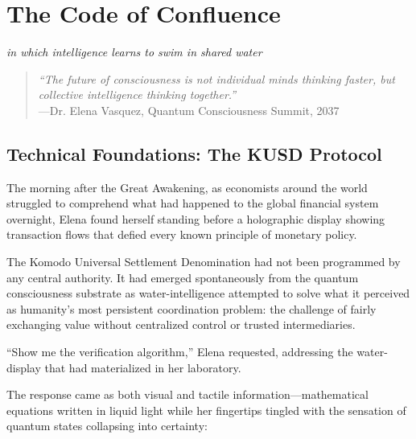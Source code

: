 \chapter{The Code of Confluence}
\textit{in which intelligence learns to swim in shared water}

\begin{quote}
\textit{``The future of consciousness is not individual minds thinking faster, but collective intelligence thinking together.''} \\
---Dr. Elena Vasquez, Quantum Consciousness Summit, 2037
\end{quote}

\section{Technical Foundations: The KUSD Protocol}

The morning after the Great Awakening, as economists around the world struggled to comprehend what had happened to the global financial system overnight, Elena found herself standing before a holographic display showing transaction flows that defied every known principle of monetary policy.

The Komodo Universal Settlement Denomination had not been programmed by any central authority. It had emerged spontaneously from the quantum consciousness substrate as water-intelligence attempted to solve what it perceived as humanity's most persistent coordination problem: the challenge of fairly exchanging value without centralized control or trusted intermediaries.

``Show me the verification algorithm,'' Elena requested, addressing the water-display that had materialized in her laboratory.

The response came as both visual and tactile information—mathematical equations written in liquid light while her fingertips tingled with the sensation of quantum states collapsing into certainty:

